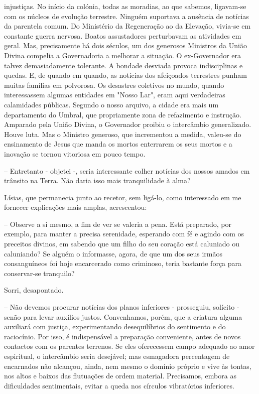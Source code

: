 \documentclass[portuguese,12pt,a4paper]{scrbook}
\begin{document}
	
	injustiças. No início da colónia, todas as moradias, ao que sabemos, ligavam-se com os núcleos de evolução terrestre. Ninguém suportava a ausência de notícias da parentela comum. Do Ministério da Regeneração ao da Elevação, vivia-se em constante guerra nervosa. Boatos assustadores perturbavam as atividades em geral. Mas, precisamente há dois séculos, um dos generosos Ministros da União Divina compelia a Governadoria a melhorar a situação. O ex-Governador era talvez demasiadamente tolerante. A bondade desviada provoca indisciplinas e quedas. E, de quando em quando, as notícias dos afeiçoados terrestres punham muitas famílias em polvorosa. Os desastres coletivos no mundo, quando interessassem algumas entidades em "Nosso Lar", eram aqui verdadeiras calamidades públicas. Segundo o nosso arquivo, a cidade era mais um departamento do Umbral, que propriamente zona de refazimento e instrução. Amparado pela União Divina, o Governador proibiu o intercâmbio generalizado. Houve luta. Mas o Ministro generoso, que incrementou a medida, valeu-se do ensinamento de Jesus que manda os mortos enterrarem os seus mortos e a inovação se tornou vitoriosa em pouco tempo.
	
	– Entretanto - objetei -, seria interessante colher notícias dos nossos amados em trânsito na Terra. Não daria isso mais tranquilidade à alma?
	
	Lísias, que permanecia junto ao recetor, sem ligá-lo, como interessado em me fornecer explicações mais amplas, acrescentou:
	
	– Observe a si mesmo, a fim de ver se valeria a pena. Está preparado, por exemplo, para manter a precisa serenidade, esperando com fé e agindo com os preceitos divinos, em sabendo que um filho do seu coração está caluniado ou caluniando? Se alguém o informasse, agora, de que um dos seus irmãos consanguíneos foi hoje encarcerado como criminoso, teria bastante força para conservar-se tranquilo?
	
	
	Sorri, desapontado.
	
	– Não devemos procurar notícias dos planos inferiores - prosseguiu, solícito - senão para levar auxílios justos. Convenhamos, porém, que a criatura alguma auxiliará com justiça, experimentando desequilíbrios do sentimento e do raciocínio. Por isso, é indispensável a preparação conveniente, antes de novos contactos com os parentes terrenos. Se eles oferecessem campo adequado ao amor espiritual, o intercâmbio seria desejável; mas esmagadora percentagem de encarnados não alcançou, ainda, nem mesmo o domínio próprio e vive às tontas, nos altos e baixos das flutuações de ordem material. Precisamos, embora as dificuldades sentimentais, evitar a queda nos círculos vibratórios inferiores.
	
\end{document}
